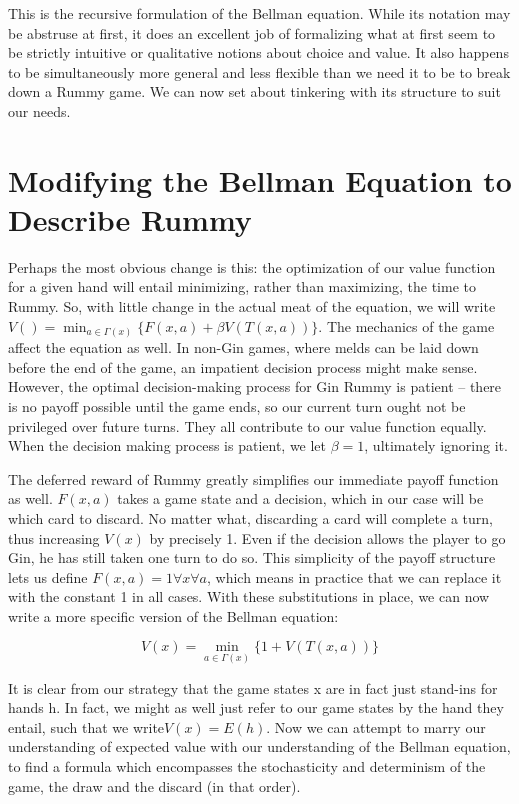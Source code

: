\documentclass[paper=a4, fontsize=11pt,twoside]{report}   %
\begin{document}
This is the recursive formulation of the Bellman equation. While its notation may be abstruse at first, it does an excellent job of formalizing what at first seem to be strictly intuitive or qualitative notions about choice and value. It also happens to be simultaneously more general and less flexible than we need it to be to break down a Rummy game. We can now set about tinkering with its structure to suit our needs. 

\section{Modifying the Bellman Equation to Describe Rummy}

Perhaps the most obvious change is this: the optimization of our value function for a given hand will entail minimizing, rather than maximizing, the time to Rummy. So, with little change in the actual meat of the equation, we will write $V() = \min_{a \in \Gamma(x)}\{F(x,a)+\beta V(T(x,a))\}$. The mechanics of the game affect the equation as well. In non-Gin games, where melds can be laid down before the end of the game, an impatient decision process might make sense. However, the optimal decision-making process for Gin Rummy is patient – there is no payoff possible until the game ends, so our current turn ought not be privileged over future turns. They all contribute to our value function equally. When the decision making process is patient, we let $\beta= 1$, ultimately ignoring it. 
 
The deferred reward of Rummy greatly simplifies our immediate payoff function as well. $F(x,a)$ takes a game state and a decision, which in our case will be which card to discard. No matter what, discarding a card will complete a turn, thus increasing $V(x)$ by precisely 1. Even if the decision allows the player to go Gin, he has still taken one turn to do so. This simplicity of the payoff structure lets us define $F(x,a) = 1 \forall x \forall a$, which means in practice that we can replace it with the constant 1 in all cases. With these substitutions in place, we can now write a more specific version of the Bellman equation:

$$V(x) = \min_{a \in \Gamma (x)} \{1+V(T(x,a))\}$$

It is clear from our strategy that the game states x are in fact just stand-ins for hands h. In fact, we might as well just refer to our game states by the hand they entail, such that we write$V(x) = E(h)$. Now we can attempt to marry our understanding of expected value with our understanding of the Bellman equation, to find a formula which encompasses the stochasticity and determinism of the game, the draw and the discard (in that order). 
\end{document}

